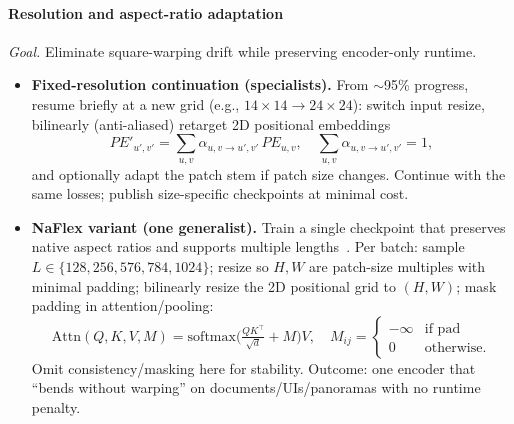 \begin{enrichment}
\begin{enrichment}
        \paragraph{Resolution and aspect-ratio adaptation}
        \noindent\emph{Goal.} Eliminate square-warping drift while preserving encoder-only runtime.
        \begin{itemize}
            \item \textbf{Fixed-resolution continuation (specialists).} From $\sim$95\% progress, resume briefly at a new grid (e.g., $14{\times}14\!\to\!24{\times}24$): switch input resize, bilinearly (anti-aliased) retarget 2D positional embeddings
            \[
            PE'_{u',v'}=\sum_{u,v}\alpha_{u,v\to u',v'}\,PE_{u,v},\quad \sum_{u,v}\alpha_{u,v\to u',v'}=1,
            \]
            and optionally adapt the patch stem if patch size changes. Continue with the same losses; publish size-specific checkpoints at minimal cost.
            \item \textbf{NaFlex variant (one generalist).} Train a single checkpoint that preserves native aspect ratios and supports multiple lengths~\cite{dehghani2023_navit,beyer2023_flexivit}. Per batch: sample $L\!\in\!\{128,256,576,784,1024\}$; resize so $H,W$ are patch-size multiples with minimal padding; bilinearly resize the 2D positional grid to $(H,W)$; mask padding in attention/pooling:
            \[
            \text{Attn}(Q,K,V,M)=\text{softmax}\!\big(\tfrac{QK^\top}{\sqrt{d}}+M\big)V,\quad M_{ij}=\begin{cases}-\infty&\text{if pad}\\0&\text{otherwise.}\end{cases}
            \]
            Omit consistency/masking here for stability. Outcome: one encoder that “bends without warping” on documents/UIs/panoramas with no runtime penalty.
        \end{itemize}
        

\end{enrichment}
\end{enrichment}
